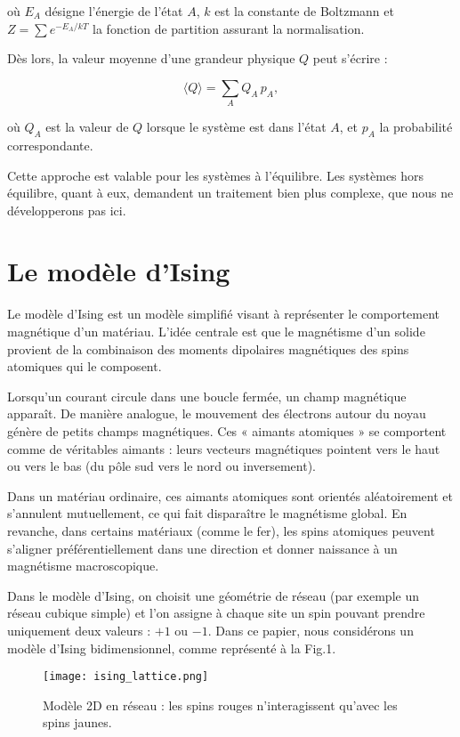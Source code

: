 \documentclass[a4paper,11pt]{article}
\begin{document}
où $E_A$ désigne l’énergie de l’état $A$, $k$ est la constante de Boltzmann et $Z = \sum e^{-E_A/kT}$ la fonction de partition assurant la normalisation.  

Dès lors, la valeur moyenne d’une grandeur physique $Q$ peut s’écrire :  

\begin{equation}
\langle Q \rangle = \sum_A Q_A \, p_A,
\end{equation}

où $Q_A$ est la valeur de $Q$ lorsque le système est dans l’état $A$, et $p_A$ la probabilité correspondante.  

Cette approche est valable pour les systèmes à l’équilibre. Les systèmes hors équilibre, quant à eux, demandent un traitement bien plus complexe, que nous ne développerons pas ici.

\section{Le modèle d’Ising}

Le modèle d’Ising est un modèle simplifié visant à représenter le comportement magnétique d’un matériau.  
L’idée centrale est que le magnétisme d’un solide provient de la combinaison des moments dipolaires magnétiques des spins atomiques qui le composent.  

Lorsqu’un courant circule dans une boucle fermée, un champ magnétique apparaît. De manière analogue, le mouvement des électrons autour du noyau génère de petits champs magnétiques. Ces « aimants atomiques » se comportent comme de véritables aimants : leurs vecteurs magnétiques pointent vers le haut ou vers le bas (du pôle sud vers le nord ou inversement).  

Dans un matériau ordinaire, ces aimants atomiques sont orientés aléatoirement et s’annulent mutuellement, ce qui fait disparaître le magnétisme global. En revanche, dans certains matériaux (comme le fer), les spins atomiques peuvent s’aligner préférentiellement dans une direction et donner naissance à un magnétisme macroscopique.  

Dans le modèle d’Ising, on choisit une géométrie de réseau (par exemple un réseau cubique simple) et l’on assigne à chaque site un spin pouvant prendre uniquement deux valeurs : $+1$ ou $-1$.  
Dans ce papier, nous considérons un modèle d’Ising bidimensionnel, comme représenté à la Fig.1.  

\begin{figure}[H]
  \centering
  \texttt{[image: ising\_lattice.png]} %
  \caption{Modèle 2D en réseau : les spins rouges n’interagissent qu’avec les spins jaunes.}
  \label{fig:ising_lattice}
\end{figure}
\end{document}
